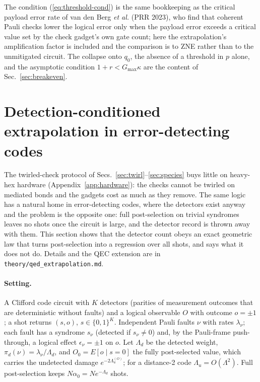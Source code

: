 \documentclass[11pt,a4paper]{article}
\theoremstyle{remark}
\begin{document}
The condition (\ref{eq:threshold-cond}) is the same bookkeeping as the critical payload error rate of van den Berg \emph{et al.} (PRR 2023), who find that coherent Pauli checks lower the logical error only when the payload error exceeds a critical value set by the check gadget's own gate count; here the extrapolation's amplification factor is included and the comparison is to ZNE rather than to the unmitigated circuit. The collapse onto $q_0$, the absence of a threshold in $p$ alone, and the asymptotic condition $1+r<G_{\max}\kappa$ are the content of Sec.~\ref{sec:breakeven}.

\section{Detection-conditioned extrapolation in error-detecting codes}
\label{sec:qed}

The twirled-check protocol of Secs.~\ref{sec:twirl}--\ref{sec:species} buys little on heavy-hex hardware (Appendix~\ref{app:hardware}): the checks cannot be twirled on mediated bonds and the gadgets cost as much as they remove. The same logic has a natural home in error-detecting codes, where the detectors exist anyway and the problem is the opposite one: full post-selection on trivial syndromes leaves no shots once the circuit is large, and the detector record is thrown away with them. This section shows that the detector count obeys an exact geometric law that turns post-selection into a regression over all shots, and says what it does not do. Details and the QEC extension are in \texttt{theory/qed\_extrapolation.md}.

\paragraph{Setting.} A Clifford code circuit with $K$ detectors (parities of measurement outcomes that are deterministic without faults) and a logical observable $O$ with outcome $o=\pm1$; a shot returns $(s,o)$, $s\in\{0,1\}^K$. Independent Pauli faults $\nu$ with rates $\lambda_\nu$; each fault has a syndrome $s_\nu$ (detected if $s_\nu\neq0$) and, by the Pauli-frame push-through, a logical effect $\epsilon_\nu=\pm1$ on $o$. Let $\Lambda_d$ be the detected weight, $\pi_d(\nu)=\lambda_\nu/\Lambda_d$, and $O_0=E[o\mid s=0]$ the fully post-selected value, which carries the undetected damage $e^{-2\Lambda_u^{(O)}}$; for a distance-2 code $\Lambda_u=O(\Lambda^2)$. Full post-selection keeps $N\alpha_0=Ne^{-\Lambda_d}$ shots.
\end{document}
